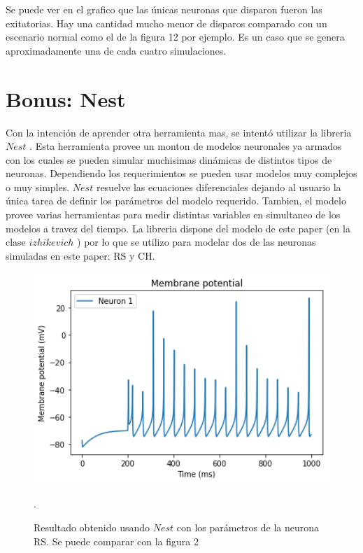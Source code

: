 \documentclass[12pt]{article}
\begin{document}
\newpage

Se puede ver en el grafico que las únicas neuronas que disparon fueron las exitatorias.
Hay una cantidad mucho menor de disparos comparado con un escenario normal como el de la figura 12 por ejemplo.
Es un caso que se genera aproximadamente una de cada cuatro simulaciones.

\newpage

\section{Bonus: Nest}

Con la intención de aprender otra herramienta mas, se intentó utilizar la libreria $Nest$ \cite{Nest}. Esta herramienta provee un monton de modelos neuronales ya armados con los cuales se pueden simular muchisimas dinámicas de distintos tipos de neuronas.
Dependiendo los requerimientos se pueden usar modelos muy complejos o muy simples.
$Nest$ resuelve las ecuaciones diferenciales dejando al usuario la única tarea de definir los parámetros del modelo requerido.
Tambien, el modelo provee varias herramientas para medir distintas variables en simultaneo de los modelos a travez del tiempo.
La libreria dispone del modelo de este paper (en la clase $izhikevich$ \cite{nest_izhikevich}) por lo que se utilizo para modelar dos de las neuronas simuladas en este paper: RS y CH.

\begin{figure}[h!]
    \centering
        \includegraphics[height=8cm]{images/RS_nest.png}
    \caption[fontsize=2pt]{Resultado obtenido usando $Nest$ con los parámetros de la neurona RS. Se puede comparar con la figura 2}.
\end{figure}
\end{document}
